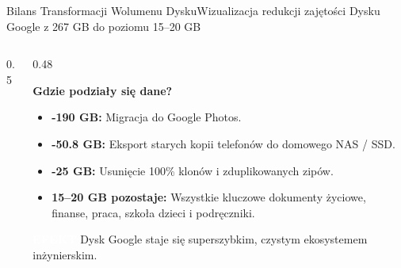 \documentclass[aspectratio=169, 10pt]{beamer}
\newcommand{\badge}[2]{{\setlength{\fboxsep}{2pt}\colorbox{#1}{\textcolor{white}{\sffamily\bfseries\tiny #2}}}}
\newcommand{\okTag}[1]{{\badge{brandGreen}{#1}}}
\begin{document}
\begin{frame}{Bilans Transformacji Wolumenu Dysku}{Wizualizacja redukcji zajętości Dysku Google z 267 GB do poziomu 15--20 GB}
  \begin{columns}[T]
    \begin{column}{0.5\textwidth}
    \end{column}

    \begin{column}{0.48\textwidth}
      \begin{block}{\textbf{Gdzie podziały się dane?}}
        \begin{itemize}
          \item \textbf{-190 GB:} Migracja do Google Photos.
          \item \textbf{-50.8 GB:} Eksport starych kopii telefonów do domowego NAS / SSD.
          \item \textbf{-25 GB:} Usunięcie 100\% klonów i zduplikowanych zipów.
          \item \textbf{15--20 GB pozostaje:} Wszystkie kluczowe dokumenty życiowe, finanse, praca, szkoła dzieci i podręczniki.
        \end{itemize}
      \end{block}
      
      \footnotesize \okTag{EFEKT} Dysk Google staje się superszybkim, czystym ekosystemem inżynierskim.
    \end{column}
  \end{columns}
\end{frame}
\end{document}
